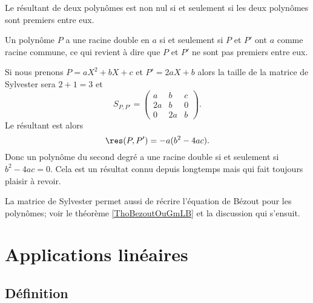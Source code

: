 \begin{proposition} \label{PropAPxzcUl}
    Le résultant de deux polynômes est non nul si et seulement si les deux polynômes sont premiers entre eux.
\end{proposition}

Un polynôme \( P\) a une racine double en \( a\) si et seulement si \( P\) et \( P'\) ont \( a\) comme racine commune, ce qui revient à dire que \( P\) et \( P'\) ne sont pas premiers entre eux. 

\begin{example}
    Si nous prenons \( P=aX^2+bX+c\) et \( P'=2aX+b\) alors la taille de la matrice de Sylvester sera \( 2+1=3\) et
    \begin{equation}
        S_{P,P'}=\begin{pmatrix}
              a  &   b    &   c    \\
            2a    &   b    &   0    \\
            0    &   2a    &   b
        \end{pmatrix}.
    \end{equation}
    Le résultant est alors
    \begin{equation}
        \res(P,P')=-a(b^2-4ac).
    \end{equation}
    Donc un polynôme du second degré a une racine double si et seulement si \( b^2-4ac=0\). Cela est un résultat connu depuis longtemps mais qui fait toujours plaisir à revoir.
\end{example}

La matrice de Sylvester permet aussi de récrire l'équation de Bézout pour les polynômes; voir le théorème \ref{ThoBezoutOuGmLB} et la discussion qui s'ensuit.

\section{Applications linéaires}

\subsection{Définition}

